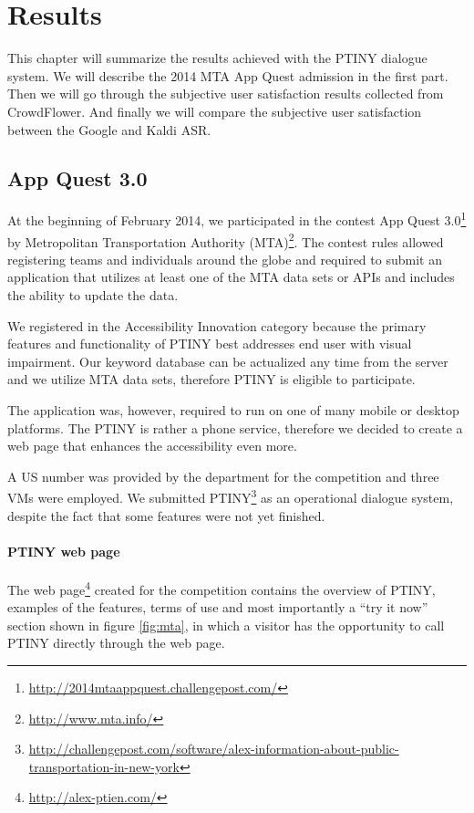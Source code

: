 \chapter{Results}

This chapter will summarize the results achieved with the PTINY dialogue system.
We will describe the 2014 MTA App Quest admission in the first part.
Then we will go through the subjective user satisfaction results collected from CrowdFlower.
And finally we will compare the subjective user satisfaction between the Google and Kaldi ASR.

\section{App Quest 3.0}

At the beginning of February 2014, we participated in the contest App Quest 3.0\footnote{\url{http://2014mtaappquest.challengepost.com/}} by Metropolitan Transportation Authority (MTA)\footnote{\url{http://www.mta.info/}}.
The contest rules allowed registering teams and individuals around the globe and required to submit an application that utilizes at least one of the MTA data sets or APIs and includes the ability to update the data.

We registered in the Accessibility Innovation category because the primary features and functionality of PTINY best addresses end user with visual impairment.
Our keyword database can be actualized any time from the server and we utilize MTA data sets, therefore PTINY is eligible to participate.

The application was, however, required to run on one of many mobile or desktop platforms.
The PTINY is rather a phone service, therefore we decided to create a web page that enhances the accessibility even more.

A US number was provided by the department for the competition and three VMs were employed.
We submitted PTINY\footnote{\url{http://challengepost.com/software/alex-information-about-public-transportation-in-new-york}} as an operational dialogue system, despite the fact that some features were not yet finished.

\subsubsection{PTINY web page}

The web page\footnote{\url{http://alex-ptien.com/}} created for the competition contains the overview of PTINY, examples of the features, terms of use and most importantly a ``try it now'' section shown in figure \ref{fig:mta}, in which a visitor has the opportunity to call PTINY directly through the web page.

